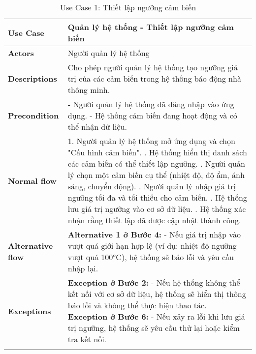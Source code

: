 \begin{longtable}{|p{}|p{}|}
    \hline
    \textbf{Use Case}         & \textbf{Quản lý hệ thống - Thiết lập ngưỡng cảm biến}                                                       \\
    \hline
    \textbf{Actors}           & Người quản lý hệ thống                                                                                      \\
    \hline
    \textbf{Descriptions}     & Cho phép người quản lý hệ thống tạo ngưỡng giá trị của các cảm biến trong hệ thống báo động nhà thông minh. \\
    \hline
    \textbf{Precondition}     &
    - Người quản lý hệ thống đã đăng nhập vào ứng dụng. \newline
    - Hệ thống cảm biến đang hoạt động và có thể nhận dữ liệu.                                                                              \\
    \hline
    \textbf{Normal flow}      &
    1. Người quản lý hệ thống mở ứng dụng và chọn "Cấu hình cảm biến". \newline
    2. Hệ thống hiển thị danh sách các cảm biến có thể thiết lập ngưỡng. \newline
    3. Người quản lý chọn một cảm biến cụ thể (nhiệt độ, độ ẩm, ánh sáng, chuyển động). \newline
    4. Người quản lý nhập giá trị ngưỡng tối đa và tối thiểu cho cảm biến. \newline
    5. Hệ thống lưu giá trị ngưỡng vào cơ sở dữ liệu. \newline
    6. Hệ thống xác nhận rằng thiết lập đã được cập nhật thành công.                                                                        \\
    \hline
    \textbf{Alternative flow} &
    \textbf{Alternative 1 ở Bước 4:} \newline
    - Nếu giá trị nhập vào vượt quá giới hạn hợp lệ (ví dụ: nhiệt độ ngưỡng vượt quá 100°C), hệ thống sẽ báo lỗi và yêu cầu nhập lại.       \\
    \hline
    \textbf{Exceptions}       &
    \textbf{Exception ở Bước 2:} \newline
    - Nếu hệ thống không thể kết nối với cơ sở dữ liệu, hệ thống sẽ hiển thị thông báo lỗi và không thể thực hiện thao tác. \newline
    \textbf{Exception ở Bước 6:} \newline
    - Nếu xảy ra lỗi khi lưu giá trị ngưỡng, hệ thống sẽ yêu cầu thử lại hoặc kiểm tra kết nối.                                             \\
    \hline
    \caption{Use Case 1: Thiết lập ngưỡng cảm biến}
    \label{tab:usecase1}
\end{longtable}

